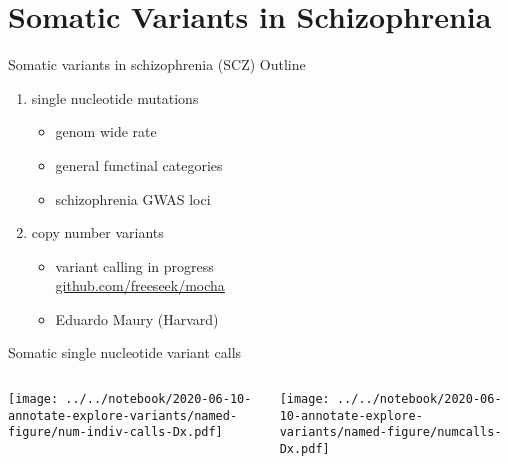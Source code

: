 \documentclass[usenames,dvipsnames]{beamer}
\begin{document}
\section{Somatic Variants in Schizophrenia}

\begin{frame}{Somatic variants in schizophrenia (SCZ)}
	Outline
\begin{enumerate}
	\item single nucleotide mutations
		\begin{itemize}
			\item genom wide rate
			\item general functinal categories
			\item schizophrenia GWAS loci
		\end{itemize}
        \item copy number variants
		\begin{itemize}
			\item variant calling in progress \\
				\url{github.com/freeseek/mocha}
			\item Eduardo Maury (Harvard)
		\end{itemize}
\end{enumerate}
\end{frame}

\begin{frame}{Somatic single nucleotide variant calls}
\begin{columns}[t]
\begin{column}{0.7\textwidth}

\texttt{[image: ../../notebook/2020-06-10-annotate-explore-variants/named-figure/num-indiv-calls-Dx.pdf]}
\end{column}

\begin{column}{0.5\textwidth}

\texttt{[image: ../../notebook/2020-06-10-annotate-explore-variants/named-figure/numcalls-Dx.pdf]}
\end{column}
\end{columns}
\end{frame}

\end{document}
